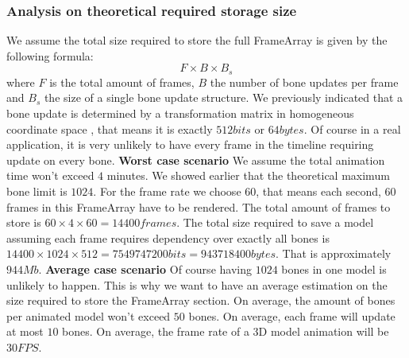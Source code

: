 \subsubsection{Analysis on theoretical required storage size}
We assume the total size required to store the full FrameArray is given by the following formula:
\begin{equation}
    F \times B \times B_s
\end{equation}
where $F$ is the total amount of frames, $B$ the number of bone updates per frame and $B_s$ the size of a single bone update structure.\newline
We previously indicated that a bone update is determined by a transformation matrix in homogeneous coordinate space \cite{HomogeneousCoordinates}, that means it is exactly $512bits$ or $64bytes$.\newline
Of course in a real application, it is very unlikely to have every frame in the timeline requiring update on every bone.
\vspace{12pt}
\newline\textbf{Worst case scenario}\newline
We assume the total animation time won't exceed $4$ minutes.\newline
We showed earlier that the theoretical maximum bone limit is $1024$.\newline
For the frame rate we choose $60$, that means each second, $60$ frames in this FrameArray have to be rendered.\newline
The total amount of frames to store is $60 \times 4 \times 60 = 14400frames$.\newline
The total size required to save a model assuming each frame requires dependency over exactly all bones is $14400 \times 1024 \times 512 = 7549747200bits = 943718400bytes$. That is approximately $944Mb$.
\vspace{12pt}
\newline\textbf{Average case scenario}\newline
Of course having $1024$ bones in one model is unlikely to happen. This is why we want to have an average estimation on the size required to store the FrameArray section.\newline
On average, the amount of bones per animated model won't exceed $50$ bones.\newline
On average, each frame will update at most $10$ bones.\newline
On average, the frame rate of a 3D model animation will be $30FPS$.\newline
